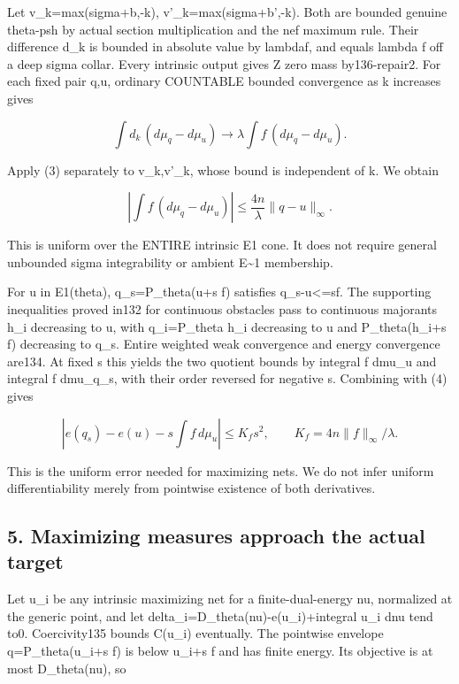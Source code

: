 \documentclass[
  10pt,
]{article}
\begin{document}
Let v\_k=max(sigma+b,-k), v'\_k=max(sigma+b',-k). Both are bounded
genuine theta-psh by actual section multiplication and the nef maximum
rule. Their difference d\_k is bounded in absolute value by
lambda\textbar\textbar f\textbar\textbar, and equals lambda f off a deep
sigma collar. Every intrinsic output gives Z zero mass by136-repair2.
For each fixed pair q,u, ordinary COUNTABLE bounded convergence as k
increases gives

\[\int d_k\,(d\mu_q-d\mu_u)\to
\lambda\int f\,(d\mu_q-d\mu_u).\]

Apply (3) separately to v\_k,v'\_k, whose bound is independent of k. We
obtain

\[\left|\int f\,(d\mu_q-d\mu_u)\right|
\leq\frac{4n}{\lambda}\|q-u\|_\infty.\tag{4}\]

This is uniform over the ENTIRE intrinsic E1 cone. It does not require
general unbounded sigma integrability or ambient E\textasciitilde1
membership.

For u in E1(theta), q\_s=P\_theta(u+s f) satisfies
\textbar\textbar q\_s-u\textbar\textbar\textless=\textbar s\textbar\textbar\textbar f\textbar\textbar.
The supporting inequalities proved in132 for continuous obstacles pass
to continuous majorants h\_i decreasing to u, with q\_i=P\_theta h\_i
decreasing to u and P\_theta(h\_i+s f) decreasing to q\_s. Entire
weighted weak convergence and energy convergence are134. At fixed s this
yields the two quotient bounds by integral f dmu\_u and integral f
dmu\_q\_s, with their order reversed for negative s. Combining with (4)
gives

\[\left|e(q_s)-e(u)-s\int f\,d\mu_u\right|
\leq K_f s^2,\qquad K_f=4n\|f\|_\infty/\lambda.\tag{5}\]

This is the uniform error needed for maximizing nets. We do not infer
uniform differentiability merely from pointwise existence of both
derivatives.

\subsection{5. Maximizing measures approach the actual
target}\label{maximizing-measures-approach-the-actual-target}

Let u\_i be any intrinsic maximizing net for a finite-dual-energy nu,
normalized at the generic point, and let
delta\_i=D\_theta(nu)-e(u\_i)+integral u\_i dnu tend to0. Coercivity135
bounds C(u\_i) eventually. The pointwise envelope q=P\_theta(u\_i+s f)
is below u\_i+s f and has finite energy. Its objective is at most
D\_theta(nu), so
\end{document}
